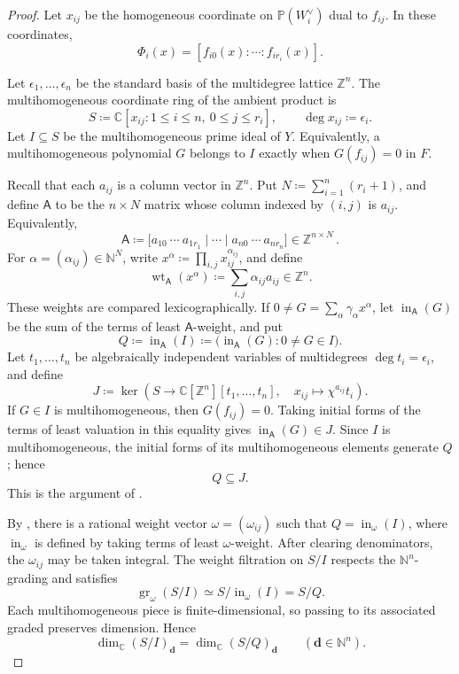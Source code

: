 \documentclass[11pt,a4paper]{amsart}
\DeclareMathOperator{\wt}{wt}
\begin{document}
\begin{proof}
Let $x_{ij}$ be the homogeneous coordinate on $\mathbb P(W_i^\vee)$ dual to
$f_{ij}$.  In these coordinates,
\[
 \Phi_i(x)=[f_{i0}(x):\cdots:f_{ir_i}(x)].
\]

Let $\epsilon_1,\ldots,\epsilon_n$ be the standard basis of the multidegree lattice $\mathbb Z^n$.  The multihomogeneous coordinate ring of
the ambient product is
\[
 S\coloneqq \mathbb C[x_{ij}:1\leq i\leq n,\ 0\leq j\leq r_i], \qquad \deg x_{ij}\coloneqq \epsilon_i.
\]
Let $I\subseteq S$ be the multihomogeneous prime ideal of $Y$.  Equivalently, a multihomogeneous polynomial $G$ belongs to $I$ exactly when $G(f_{ij})=0$ in $F$.

Recall that each $a_{ij}$ is a column vector in $\mathbb Z^n$.  Put $N\coloneqq \sum_{i=1}^n(r_i+1)$, and define $\mathsf A$ to be the $n\times N$ matrix whose column indexed by $(i,j)$ is $a_{ij}$.  Equivalently,
\[
 \mathsf A\coloneqq \bigl[a_{10}\ \cdots\ a_{1r_1}\mid\cdots\mid
                   a_{n0}\ \cdots\ a_{nr_n}\bigr]
 \in\mathbb Z^{n\times N}
\,.
\]
For
$\alpha=(\alpha_{ij})\in\mathbb N^N$, write
$x^\alpha\coloneqq \prod_{i,j}x_{ij}^{\alpha_{ij}}$, and define
\[
 \wt_{\mathsf A}(x^\alpha)
 \coloneqq \sum_{i,j}\alpha_{ij}a_{ij}\in\mathbb Z^n.
\]
These weights are compared lexicographically.  If
$0\neq G=\sum_\alpha\gamma_\alpha x^\alpha$, let
$\operatorname{in}_{\mathsf A}(G)$ be the sum of the terms of least
$\mathsf A$-weight, and
put
\[
 Q\coloneqq \operatorname{in}_{\mathsf A}(I)
 \coloneqq \bigl(\operatorname{in}_{\mathsf A}(G):0\neq G\in I\bigr).
\]
Let $t_1,\ldots,t_n$ be algebraically independent variables of
multidegrees $\deg t_i=\epsilon_i$, and define
\[
 J\coloneqq \ker\left(S\longrightarrow
 \mathbb C[\mathbb Z^n][t_1,\ldots,t_n],\quad
 x_{ij}\longmapsto\chi^{a_{ij}}t_i\right).
\]
If $G\in I$ is multihomogeneous, then $G(f_{ij})=0$.  Taking initial forms
of the terms of least valuation in this equality gives
$\operatorname{in}_{\mathsf A}(G)\in J$.  Since $I$ is multihomogeneous, the initial
forms of its multihomogeneous elements generate $Q$; hence
\[
 Q\subseteq J.
\]
This is the argument of \cite[Lemma~2.16]{KM19}.

By \cite[Proposition~8.10]{KM19}, there is a rational weight vector
$\omega=(\omega_{ij})$ such that
$Q=\operatorname{in}_\omega(I)$, where $\operatorname{in}_\omega$ is
defined by taking terms of least $\omega$-weight.  After clearing denominators,
the $\omega_{ij}$ may be taken integral.  The weight filtration on $S/I$
respects the $\mathbb N^n$-grading and satisfies
\[
 \operatorname{gr}_\omega(S/I)
 \simeq S/\operatorname{in}_\omega(I)=S/Q.
\]
Each multihomogeneous piece is finite-dimensional, so passing to its
associated graded preserves dimension.  Hence
\begin{equation}\label{eq:hilbert-functions}
 \dim_{\mathbb C}(S/I)_{\mathbf d}
 =\dim_{\mathbb C}(S/Q)_{\mathbf d}
 \qquad(\mathbf d\in\mathbb N^n).
\end{equation}


\end{proof}
\end{document}
